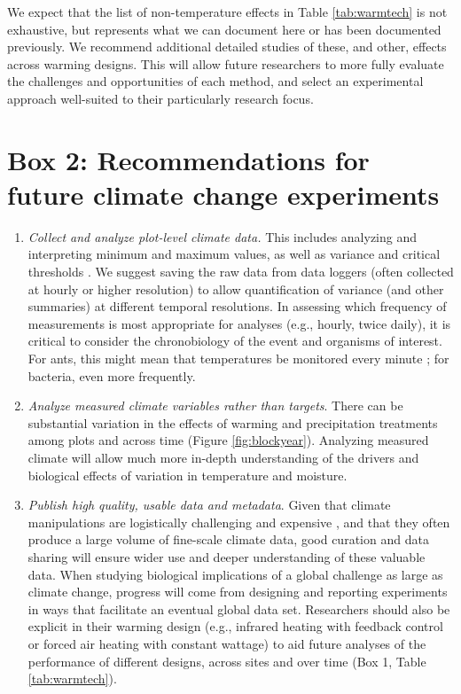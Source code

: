 \documentclass{article}
\begin{document}
\par We expect that the list of non-temperature effects in Table \ref{tab:warmtech} is not exhaustive, but represents what we can document here or has been documented previously. We recommend additional detailed studies of these, and other, effects across warming designs. This will allow future researchers to more fully evaluate the challenges and opportunities of each method, and select an experimental approach well-suited to their particularly research focus. 

\section* {Box 2: Recommendations for future climate change experiments} 
\begin{enumerate}
\item\textit{Collect and analyze plot-level climate data.} This includes analyzing and interpreting minimum and maximum values, as well as variance and critical thresholds \citep[e.g., the number and duration of freeze-thaw events and accumulated chilling hours,][]{mcdaniel2014,vasseur2014}. We suggest saving the raw data from data loggers (often collected at hourly or higher resolution) to allow quantification of variance (and other summaries) at different temporal resolutions. In assessing which frequency of measurements is most appropriate for analyses (e.g., hourly, twice daily), it is critical to consider the chronobiology of the event and organisms of interest. For ants, this might mean that temperatures be monitored every minute \citep{shavit2017}; for bacteria, even more frequently. 
\item\textit{Analyze measured climate variables rather than targets}. There can be substantial variation in the effects of warming and precipitation treatments among plots and across time (Figure \ref{fig:blockyear}). Analyzing measured climate will allow much more in-depth understanding of the drivers and biological effects of variation in temperature and moisture.
\item\textit{Publish high quality, usable data and metadata}. Given that climate manipulations are logistically challenging and expensive \citep{aronson2009}, and that they often produce a large volume of fine-scale climate data, good curation and data sharing will ensure wider use and deeper understanding of these valuable data. When studying biological implications of a global challenge as large as climate change, progress will come from designing and reporting experiments in ways that facilitate an eventual global data set. Researchers should also be explicit in their warming design (e.g., infrared heating with feedback control or forced air heating with constant wattage) to aid future analyses of the performance of different designs, across sites and over time (Box 1, Table \ref{tab:warmtech}). 

\end{enumerate}
\end{document}
